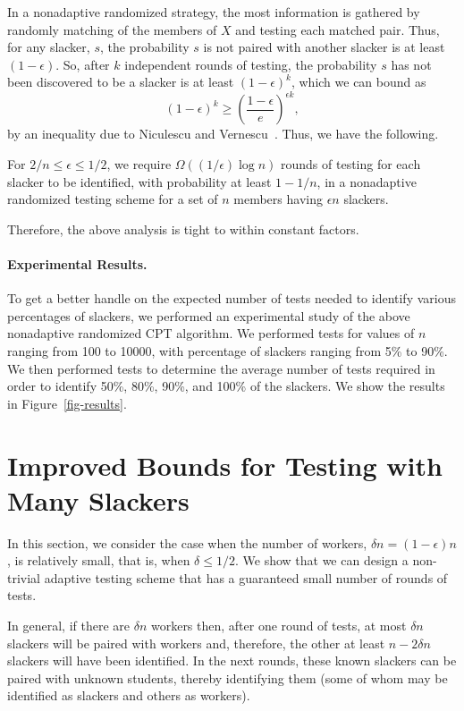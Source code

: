 \documentclass[11pt]{llncs}
\renewcommand{\subsection}[1]{\paragraph{\bf #1.}}
\begin{document}
In a nonadaptive randomized strategy, the most information is gathered by
randomly matching of the members of $X$ and testing each matched
pair.
Thus, for any slacker, $s$, the probability $s$ is not paired with 
another slacker is at least $(1-\epsilon)$.
So, after $k$ independent rounds of testing, the probability $s$ has not
been discovered to be a slacker is at least $(1-\epsilon)^k$, which
we can bound as
\[
(1-\epsilon)^k \ge \left( \frac{1-\epsilon}{e}\right)^{\epsilon k} ,
\]
by an inequality due to Niculescu and Vernescu~\cite{niculescu2004two}.
Thus, we have the following.

\begin{theorem}
For $2/n\le \epsilon\le 1/2$, we require $\Omega((1/\epsilon)\log n)$ rounds
of testing for each slacker to be identified, with probability at least
$1-1/n$, in a nonadaptive randomized testing scheme for a set of $n$
members having $\epsilon n$ slackers.
\end{theorem}

Therefore, the above analysis is tight to within constant factors.

\subsection{Experimental Results}
To get a better handle on the expected number of tests needed
to identify various percentages of slackers, we performed an experimental
study of the above nonadaptive randomized CPT algorithm.
We performed tests for values of $n$ ranging from 100 to 10000, with 
percentage of slackers ranging from 5\% to 90\%.
We then performed tests to determine the average number of tests required 
in order to identify 50\%, 80\%, 90\%, and 100\% of the slackers.
We show the results in Figure~\ref{fig-results}.

 
\ifFull
\section{Improved Bounds for Testing with Many Slackers}
\label{sec:many}
In this section, we consider the case when the
number of workers, $\delta n=(1-\epsilon)n$, is relatively
small, that is, when $\delta\le 1/2$.
We show that we can design a
non-trivial adaptive testing 
scheme that has a guaranteed small number of rounds of tests.

In general, if there are $\delta n$ workers then, after one round of tests,
at most $\delta n$ slackers will be paired with workers and, therefore, the other
at least $n - 2 \delta n$ slackers will have been identified.  
In the next rounds,
these known slackers can be paired with unknown students, thereby identifying them
(some of whom may be identified as slackers and others as workers).
\end{document}
